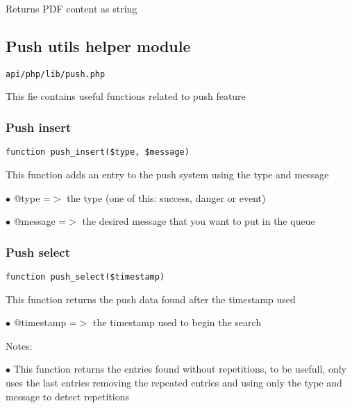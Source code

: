 \documentclass[a4paper]{article}
\begin{document}
Returns PDF content as string

\hypertarget{toc516}{}
\subsection{Push utils helper module}

\begin{lstlisting}
api/php/lib/push.php
\end{lstlisting}

This fie contains useful functions related to push feature

\hypertarget{toc517}{}
\subsubsection{Push insert}

\begin{lstlisting}
function push_insert($type, $message)
\end{lstlisting}

This function adds an entry to the push system using the type and message

\begin{compactitem}
\item[\color{myblue}$\bullet$] @type    =$>$ the type (one of this: success, danger or event)
\item[\color{myblue}$\bullet$] @message =$>$ the desired message that you want to put in the queue
\end{compactitem}

\hypertarget{toc518}{}
\subsubsection{Push select}

\begin{lstlisting}
function push_select($timestamp)
\end{lstlisting}

This function returns the push data found after the timestamp used

\begin{compactitem}
\item[\color{myblue}$\bullet$] @timestamp =$>$ the timestamp used to begin the search
\end{compactitem}

Notes:

\begin{compactitem}
\item[\color{myblue}$\bullet$] This function returns the entries found without repetitions, to be
  usefull, only uses the last entries removing the repeated entries and
  using only the type and message to detect repetitions
\end{compactitem}
\end{document}
